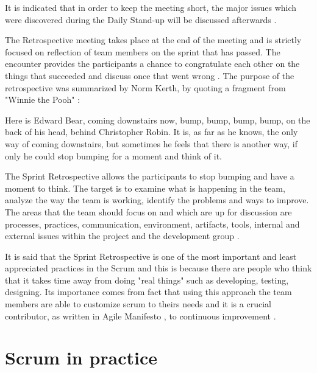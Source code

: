 It is indicated that in order to keep the meeting short, the major issues which were discovered during the Daily Stand-up will be discussed afterwards \cite{DotNetScrumBook}.

The Retrospective meeting takes place at the end of the meeting and is strictly focused on reflection of team members on the sprint that has passed. The encounter provides the participants a chance to congratulate each other on the things that succeeded and discuss once that went wrong \cite{DotNetScrumBook}. The purpose of the retrospective was summarized by Norm Kerth, by quoting a fragment from "Winnie the Pooh" \cite{ScrumBook}:
\begin{displayquote}
Here is Edward Bear, coming downstairs now, bump, bump, bump, bump, on the back of his head, behind Christopher Robin. It is, as far as he knows, the only way of coming downstairs, but sometimes he feels that there is another way, if only he could stop bumping for a moment and think of it.
\end{displayquote}

The Sprint Retrospective allows the participants to stop bumping and have a moment to think. The target is to examine what is happening in the team, analyze the way the team is working, identify the problems and ways to improve. The areas that the team should focus on and which are up for discussion are processes, practices, communication, environment, artifacts, tools, internal and external issues within the project and the development group \cite{ScrumBook}.

It is said that the Sprint Retrospective is one of the most important and least appreciated practices in the Scrum and this is because there are people who think that it takes time away from doing "real things" such as developing, testing, designing. Its importance comes from fact that using this approach the team members are able to customize scrum to theirs needs and it is a crucial contributor, as written in Agile Manifesto \cite{AgileManifesto}, to continuous improvement \cite{ScrumBook}.

\section{Scrum in practice}


